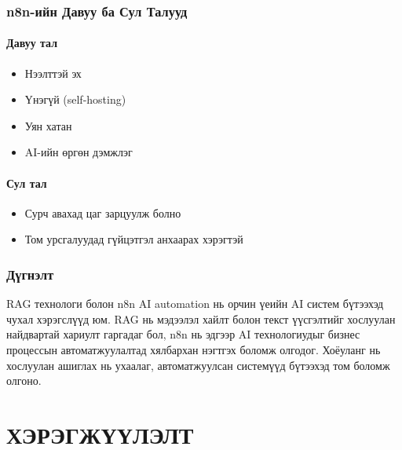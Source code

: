 \documentclass[12pt,A4]{report}
\begin{document}
\subsection{n8n-ийн Давуу ба Сул Талууд}

\subsubsection{Давуу тал}
\begin{itemize}
    \item Нээлттэй эх
    \item Үнэгүй (self-hosting)
    \item Уян хатан
    \item AI-ийн өргөн дэмжлэг
\end{itemize}

\subsubsection{Сул тал}
\begin{itemize}
    \item Сурч авахад цаг зарцуулж болно
    \item Том урсгалуудад гүйцэтгэл анхаарах хэрэгтэй
\end{itemize}

\subsection{Дүгнэлт}

RAG технологи болон n8n AI automation нь орчин үеийн AI систем бүтээхэд чухал хэрэгслүүд юм. RAG нь мэдээлэл хайлт болон текст үүсгэлтийг хослуулан найдвартай хариулт гаргадаг бол, n8n нь эдгээр AI технологиудыг бизнес процессын автоматжуулалтад хялбархан нэгтгэх боломж олгодог. Хоёуланг нь хослуулан ашиглах нь ухаалаг, автоматжуулсан системүүд бүтээхэд том боломж олгоно.

\chapter{ХЭРЭГЖҮҮЛЭЛТ}


\end{document}
